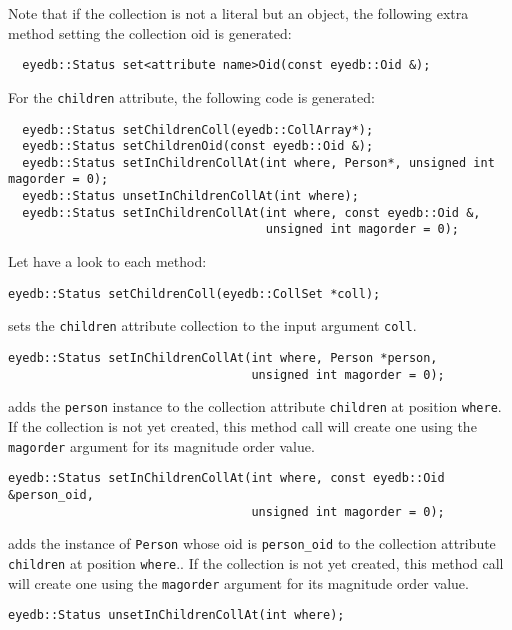 Note that if the collection is not a literal but an object, the following
extra method setting the collection oid is generated:
\verbsize
\begin{verbatim}
  eyedb::Status set<attribute name>Oid(const eyedb::Oid &);
\end{verbatim}
\normalsize
For the \texttt{children} attribute, the following code is generated:
\verbsize
\begin{verbatim}
  eyedb::Status setChildrenColl(eyedb::CollArray*);
  eyedb::Status setChildrenOid(const eyedb::Oid &);
  eyedb::Status setInChildrenCollAt(int where, Person*, unsigned int magorder = 0);
  eyedb::Status unsetInChildrenCollAt(int where);
  eyedb::Status setInChildrenCollAt(int where, const eyedb::Oid &,
                                    unsigned int magorder = 0);
\end{verbatim}
\normalsize
Let have a look to each method:
\be
\item
\verbsize
\begin{verbatim}
eyedb::Status setChildrenColl(eyedb::CollSet *coll);
\end{verbatim}
\normalsize
sets the \texttt{children} attribute collection to the input argument
\texttt{coll}.
\item
\verbsize
\begin{verbatim}
eyedb::Status setInChildrenCollAt(int where, Person *person,
                                  unsigned int magorder = 0);
\end{verbatim}
\normalsize
adds the \texttt{person} instance to the collection attribute \texttt{children} at position \texttt{where}.
If the collection is not yet created, this method call will create one
using the \texttt{magorder} argument for its magnitude order value.
\item
\verbsize
\begin{verbatim}
eyedb::Status setInChildrenCollAt(int where, const eyedb::Oid &person_oid,
                                  unsigned int magorder = 0);
\end{verbatim}
\normalsize
adds the instance of \texttt{Person} whose oid is \texttt{person\_oid}
to the collection attribute \texttt{children} at position \texttt{where}..
If the collection is not yet created, this method call will create one
using the \texttt{magorder} argument for its magnitude order value.
\item
\verbsize
\begin{verbatim}
eyedb::Status unsetInChildrenCollAt(int where);
\end{verbatim}
